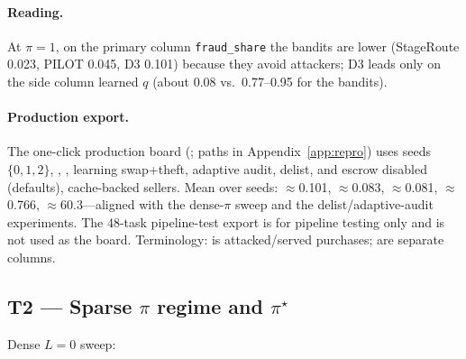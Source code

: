 \documentclass[sigconf,review]{acmart}
\newcommand{\pistar}{\pi^\star}
\begin{document}
\paragraph{Reading.} At $\pi=1$, on the primary column \texttt{fraud\_share} the bandits are lower (StageRoute 0.023, PILOT 0.045, D3 0.101) because they avoid attackers; D3 leads only on the side column learned $q$ (about 0.08 vs.\ 0.77--0.95 for the bandits).

\paragraph{Production export.} The one-click production board (; paths in Appendix~\ref{app:repro}) uses seeds $\{0,1,2\}$, , , learning swap+theft, adaptive audit, delist, and escrow disabled (defaults), cache-backed sellers. Mean over seeds: $\approx$0.101, $\approx$0.083, $\approx$0.081, $\approx$0.766, $\approx$60.3---aligned with the dense-$\pi$ sweep and the delist/adaptive-audit experiments. The 48-task pipeline-test export is for pipeline testing only and is not used as the board. Terminology:  is attacked/served purchases;  are separate columns.

\subsection{T2 --- Sparse $\pi$ regime and $\pistar$}
\label{sec:t2}

Dense $L=0$ sweep:
\end{document}
